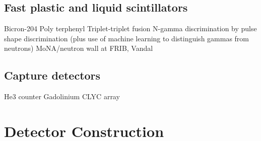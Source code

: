 \subsection{Fast plastic and liquid scintillators}
Bicron-204
Poly terphenyl
Triplet-triplet fusion
N-gamma discrimination by pulse shape discrimination (plus use of machine learning to distinguish
gammas from neutrons)
MoNA/neutron wall at FRIB, Vandal

\subsection{Capture detectors}
He3 counter
Gadolinium
CLYC array

\section{Detector Construction}
